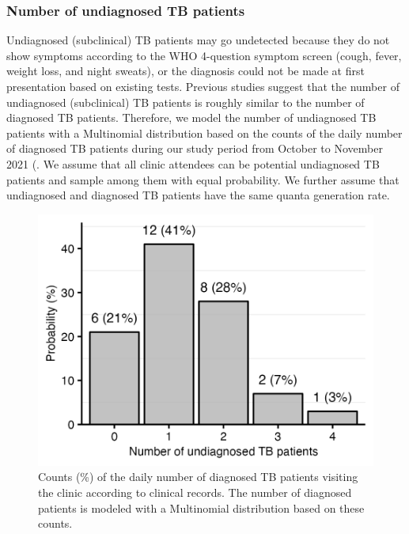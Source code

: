 \documentclass[fleqn,11pt]{wlscirep_supp}
\begin{document}
\subsubsection{Number of undiagnosed TB patients}

Undiagnosed (subclinical) TB patients may go undetected because they do not show symptoms according to the WHO 4-question symptom screen (cough, fever, weight loss, and night sweats), or the diagnosis could not be made at first presentation based on existing tests\cite{Patterson2023Preprint}. Previous studies suggest that the number of undiagnosed (subclinical) TB patients is roughly similar to the number of diagnosed TB patients\cite{Berhanu2023CID,Moyo2022LancetID}. Therefore, we model the number of undiagnosed TB patients with a Multinomial distribution based on the counts of the daily number of diagnosed TB patients during our study period from October to November 2021 (. We assume that all clinic attendees can be potential undiagnosed TB patients and sample among them with equal probability. We further assume that undiagnosed and diagnosed TB patients have the same quanta generation rate.

\begin{figure}[!htpb]
    \centering
    \includegraphics{results/inputs/undiagnosed-tb-patients.png}
    \caption{Counts (\%) of the daily number of diagnosed TB patients visiting the clinic according to clinical records. The number of diagnosed patients is modeled with a Multinomial distribution based on these counts.}
    \label{fig:undiagnosed-distribution}
\end{figure}
\end{document}
